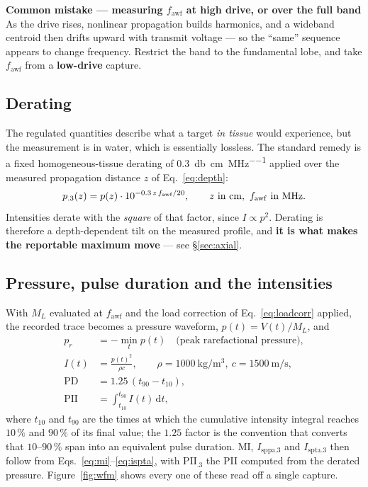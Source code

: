 \documentclass[11pt,a4paper]{article}
\newcommand{\mistaketitle}[1]{\textcolor{orange!75!black}{\textbf{Common mistake --- #1}}\\[2pt]}
\begin{document}
\begin{mistake}
\mistaketitle{measuring $f_\mathrm{awf}$ at high drive, or over the full band}
As the drive rises, nonlinear propagation builds harmonics, and a wideband centroid then drifts
upward with transmit voltage --- so the ``same'' sequence appears to change frequency. Restrict the
band to the fundamental lobe, and take $f_\mathrm{awf}$ from a \textbf{low-drive} capture.
\end{mistake}

\subsection{Derating}
The regulated quantities describe what a target \emph{in tissue} would experience, but the
measurement is in water, which is essentially lossless. The standard remedy is a fixed
homogeneous-tissue derating of \SI{0.3}{\decibel\per\centi\metre\per\mega\hertz} applied over the
measured propagation distance $z$ of Eq.~\ref{eq:depth}:
\begin{equation}
  p_{.3}(z) = p(z)\cdot 10^{-0.3\,z\,f_\mathrm{awf}/20},
  \qquad z\ \text{in \si{\centi\metre}},\ f_\mathrm{awf}\ \text{in \si{\mega\hertz}} .
  \label{eq:derate}
\end{equation}
Intensities derate with the \emph{square} of that factor, since $I\propto p^2$. Derating is therefore
a depth-dependent tilt on the measured profile, and \textbf{it is what makes the reportable maximum
move} --- see \S\ref{sec:axial}.

\subsection{Pressure, pulse duration and the intensities}
With $M_L$ evaluated at $f_\mathrm{awf}$ and the load correction of Eq.~\ref{eq:loadcorr} applied, the
recorded trace becomes a pressure waveform, $p(t) = V(t)/M_L$, and
\begin{align}
  p_r      &= -\min_t p(t) \quad\text{(peak rarefactional pressure)}, \\
  I(t)     &= \frac{p(t)^2}{\rho c}, \qquad \rho=\SI{1000}{\kilo\gram\per\cubic\metre},\ c=\SI{1500}{\metre\per\second},\\
  \mathrm{PD} &= 1.25\,(t_{90}-t_{10}), \\
  \mathrm{PII} &= \int_{t_{10}}^{t_{90}} I(t)\,\mathrm{d}t ,
\end{align}
where $t_{10}$ and $t_{90}$ are the times at which the cumulative intensity integral reaches
$10\,\%$ and $90\,\%$ of its final value; the $1.25$ factor is the convention that converts that
$10$--$90\,\%$ span into an equivalent pulse duration. MI, $I_\mathrm{sppa.3}$ and
$I_\mathrm{spta.3}$ then follow from Eqs.~\ref{eq:mi}--\ref{eq:ispta}, with $\mathrm{PII}_{.3}$ the
PII computed from the derated pressure. Figure~\ref{fig:wfm} shows every one of these read off a
single capture.
\end{document}
